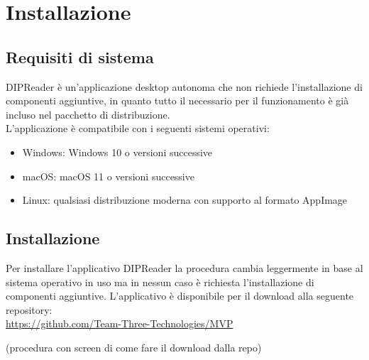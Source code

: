 \documentclass[a4paper,12pt]{article}
\begin{document}
    \section{Installazione}
        \subsection{Requisiti di sistema}
        DIPReader è un'applicazione desktop autonoma che non richiede l'installazione di componenti aggiuntive, in quanto tutto il necessario per il funzionamento è già incluso nel pacchetto di distribuzione.\\

        L'applicazione è compatibile con i seguenti sistemi operativi:
        \begin{itemize}
            \item Windows: Windows 10 o versioni successive
            \item macOS: macOS 11 o versioni successive
            \item Linux: qualsiasi distribuzione moderna con supporto al formato AppImage
        \end{itemize}

        \subsection{Installazione}
            Per installare l'applicativo DIPReader la procedura cambia leggermente in base al sistema operativo in uso ma in nessun caso è richiesta l'installazione di componenti aggiuntive.
            L'applicativo è disponibile per il download alla seguente repository: \\
            \url{https://github.com/Team-Three-Technologies/MVP}

            (procedura con screen di come fare il download dalla repo)
\end{document}
